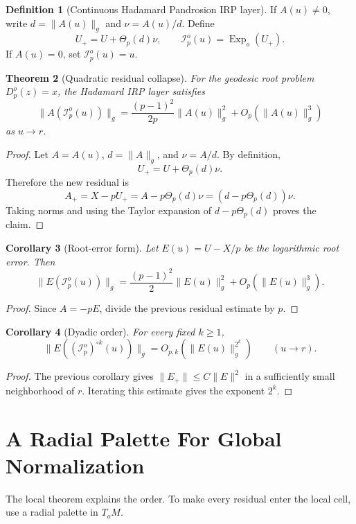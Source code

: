 \documentclass[10pt,a4paper]{article}
\theoremstyle{plain}
\newtheorem{theorem}{Theorem}[section]
\newtheorem{corollary}[theorem]{Corollary}
\theoremstyle{definition}
\newtheorem{definition}[theorem]{Definition}
\newcommand{\Exp}{\operatorname{Exp}}
\newcommand{\IRP}{\mathcal I}
\begin{document}
\begin{definition}[Continuous Hadamard Pandrosion IRP layer]
If $A(u)\ne0$, write $d=\|A(u)\|_g$ and $\nu=A(u)/d$.  Define
\[
  U_+=U+\Theta_p(d)\nu,\qquad
  \IRP_p^o(u)=\Exp_o(U_+).
\]
If $A(u)=0$, set $\IRP_p^o(u)=u$.
\end{definition}

\begin{theorem}[Quadratic residual collapse]
For the geodesic root problem $D_p^o(z)=x$, the Hadamard IRP layer satisfies
\[
  \|A(\IRP_p^o(u))\|_g
    =\frac{(p-1)^2}{2p}\|A(u)\|_g^2
      +O_p(\|A(u)\|_g^3)
\]
as $u\to r$.
\end{theorem}

\begin{proof}
Let $A=A(u)$, $d=\|A\|_g$, and $\nu=A/d$.  By definition,
\[
  U_+=U+\Theta_p(d)\nu.
\]
Therefore the new residual is
\[
  A_+
    =X-pU_+
    =A-p\Theta_p(d)\nu
    =(d-p\Theta_p(d))\nu.
\]
Taking norms and using the Taylor expansion of $d-p\Theta_p(d)$ proves the
claim.
\end{proof}

\begin{corollary}[Root-error form]
Let $E(u)=U-X/p$ be the logarithmic root error.  Then
\[
  \|E(\IRP_p^o(u))\|_g
    =\frac{(p-1)^2}{2}\|E(u)\|_g^2
      +O_p(\|E(u)\|_g^3).
\]
\end{corollary}

\begin{proof}
Since $A=-pE$, divide the previous residual estimate by $p$.
\end{proof}

\begin{corollary}[Dyadic order]
For every fixed $k\ge1$,
\[
  \|E((\IRP_p^o)^{\circ k}(u))\|_g
    =O_{p,k}(\|E(u)\|_g^{2^k})
    \qquad (u\to r).
\]
\end{corollary}

\begin{proof}
The previous corollary gives $\|E_+\|\le C\|E\|^2$ in a sufficiently small
neighborhood of $r$.  Iterating this estimate gives the exponent $2^k$.
\end{proof}

\section{A Radial Palette For Global Normalization}

The local theorem explains the order.  To make every residual enter the local
cell, use a radial palette in $T_oM$.
\end{document}
